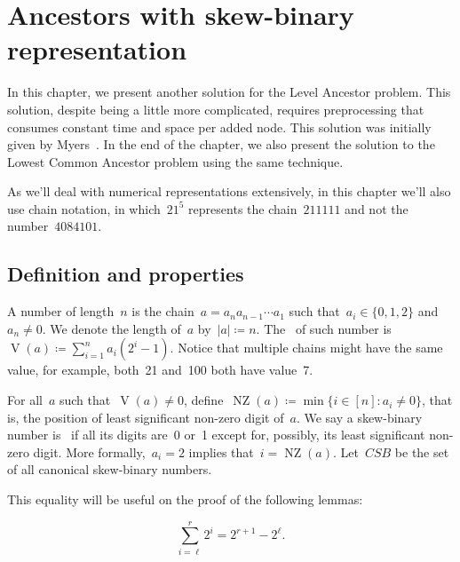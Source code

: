 \documentclass[main.tex]{subfiles}
\newcommand{\NZ}{\operatorname{NZ}}
\newcommand{\CSB}{\textit{CSB}}
\renewcommand{\V}{\operatorname{V}}
\begin{document}
\chapter{Ancestors with skew-binary representation} \label{cap:skew}

In this chapter, we present another solution for the Level Ancestor problem. This solution, despite being a little more complicated, requires preprocessing that consumes constant time and space per added node. This solution was initially given by Myers~\cite{Myers83}. In the end of the chapter, we also present the solution to the Lowest Common Ancestor problem using the same technique.

As we'll deal with numerical representations extensively, in this chapter we'll also use chain notation, in which~$21^5$ represents the chain~$211111$ and not the number~$4084101$.

\section{Definition and properties}

A  number of length~$n$ is the chain~${a = a_n a_{n-1} \cdots a_1}$ such that~${a_i \in \{0, 1, 2\}}$ and~$a_n \neq 0$. We denote the length of~$a$ by~$|a| \coloneqq n$. The~ of such number is~${\V(a) \coloneqq \sum\limits_{i = 1}^n{a_i (2^i - 1)}}$. Notice that multiple chains might have the same value, for example, both~21 and~100 both have value~7.

For all~$a$ such that~$\V(a) \neq 0$, define~$\NZ(a) \coloneqq \min\{i \in [n] : a_i \neq 0\}$, that is, the position of least significant non-zero digit of~$a$. We say a skew-binary number is~ if all its digits are~0 or~1 except for, possibly, its least significant non-zero digit. More formally,~${a_i = 2}$ implies that~${i = \NZ(a)}$. Let~$\CSB$ be the set of all canonical skew-binary numbers.


This equality will be useful on the proof of the following lemmas:

\begin{equation} \tag{A} \label{eq:sum2}
	\sum\limits_{i = \ell}^r{2^i} = 2^{r+1} - 2^{\ell}.
\end{equation}
\end{document}
